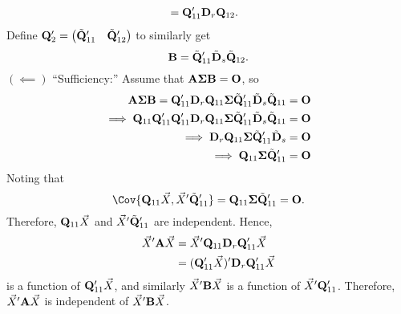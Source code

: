 \begin{Theorem}{}{}
\begin{align*}
         & =\mathbf{Q}_{11}'\mathbf{D}_r \mathbf{Q}_{12}.
    \end{align*}
    Define $ \mathbf{Q}_2'=\begin{pmatrix}
            \tilde{\mathbf{Q}}_{11}' & \tilde{\mathbf{Q}}_{12}'
        \end{pmatrix} $ to similarly get
    \[ \mathbf{B}=\tilde{\mathbf{Q}}_{11}'\tilde{\mathbf{D}}_s \tilde{\mathbf{Q}}_{12}. \]
    $ (\impliedby) $ ``Sufficiency:'' Assume that $ \mathbf{A\Sigma B}=\mathbf{O} $, so
    \begin{align*}
        \mathbf{A\Sigma B}=\mathbf{Q}_{11}'\mathbf{D}_r \mathbf{Q}_{11} \mathbf{\Sigma}\tilde{\mathbf{Q}}_{11}'\tilde{\mathbf{D}}_s\tilde{\mathbf{Q}}_{11}                      & =\mathbf{O} \\
        \implies \mathbf{Q}_{11}\mathbf{Q}_{11}'\mathbf{Q}_{11}'\mathbf{D}_r \mathbf{Q}_{11} \mathbf{\Sigma}\tilde{\mathbf{Q}}_{11}'\tilde{\mathbf{D}}_s\tilde{\mathbf{Q}}_{11} & =\mathbf{O} \\
        \implies \mathbf{D}_r \mathbf{Q}_{11}\mathbf{\Sigma}\tilde{\mathbf{Q}}_{11}'\tilde{\mathbf{D}}_s                                                                        & =\mathbf{O} \\
        \implies \mathbf{Q}_{11}\mathbf{\Sigma}\tilde{\mathbf{Q}}_{11}'                                                                                                         & =\mathbf{O}
    \end{align*}
    Noting that
    \[ \Cov{\Matrix{Q}_{11}\Vector{X},\Vector{X}'\tilde{\Matrix{Q}}_{11}'}=\Matrix{Q}_{11}\Matrix{\Sigma}\tilde{\Matrix{Q}}_{11}'=\Matrix{O}. \]
    Therefore, $ \mathbf{Q}_{11}\vec{X} $ and $ \vec{X}'\tilde{\mathbf{Q}}_{11}' $ are independent. Hence,
    \begin{align*}
        \vec{X}'\mathbf{A}\vec{X}
         & =\vec{X}'\mathbf{Q}_{11}\mathbf{D}_r \mathbf{Q}_{11}'\vec{X}      \\
         & =(\mathbf{Q}_{11}'\vec{X})' \mathbf{D}_r \mathbf{Q}_{11}' \vec{X}
    \end{align*}
    is a function of $ \mathbf{Q}_{11}'\vec{X} $, and
    similarly $ \vec{X}'\mathbf{B}\vec{X} $ is a function of
    $ \vec{X}'\mathbf{Q}_{11}' $. Therefore,
    $ \vec{X}'\mathbf{A}\vec{X} $ is independent of $ \vec{X}'\mathbf{B}\vec{X} $.


\end{Theorem}
